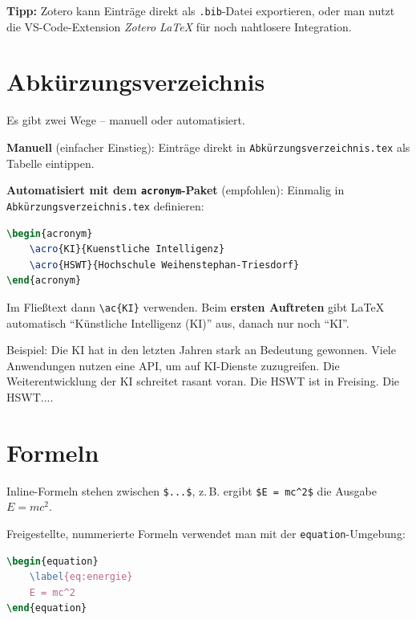 \textbf{Tipp:} Zotero kann Einträge direkt als \texttt{.bib}-Datei exportieren, oder man nutzt die VS-Code-Extension \textit{Zotero LaTeX} für noch nahtlosere Integration.

\section{Abkürzungsverzeichnis}
\label{sec:abkuerzungen}

Es gibt zwei Wege – manuell oder automatisiert.

\textbf{Manuell} (einfacher Einstieg): Einträge direkt in \texttt{Abkürzungsverzeichnis.tex} als Tabelle eintippen.

\textbf{Automatisiert mit dem \texttt{acronym}-Paket} (empfohlen):
Einmalig in \texttt{Abkürzungsverzeichnis.tex} definieren:

\begin{lstlisting}[language=tex]
\begin{acronym}
    \acro{KI}{Kuenstliche Intelligenz}
    \acro{HSWT}{Hochschule Weihenstephan-Triesdorf}
\end{acronym}
\end{lstlisting}

Im Fließtext dann \texttt{\textbackslash ac\{KI\}} verwenden.
Beim \textbf{ersten Auftreten} gibt LaTeX automatisch \enquote{Künstliche Intelligenz (KI)} aus, danach nur noch \enquote{KI}.

Beispiel: Die \ac{KI} hat in den letzten Jahren stark an Bedeutung gewonnen.
Viele Anwendungen nutzen eine \ac{API}, um auf \ac{KI}-Dienste zuzugreifen.
Die Weiterentwicklung der \ac{KI} schreitet rasant voran.
Die \ac{HSWT} ist in Freising. Die \ac{HSWT}....

\section{Formeln}
\label{sec:formeln}

Inline-Formeln stehen zwischen \texttt{\$...\$}, z.\,B. ergibt \texttt{\$E = mc\^{}2\$} die Ausgabe $E = mc^2$.

Freigestellte, nummerierte Formeln verwendet man mit der \texttt{equation}-Umgebung:

\begin{lstlisting}[language=tex]
\begin{equation}
    \label{eq:energie}
    E = mc^2
\end{equation}
\end{lstlisting}

